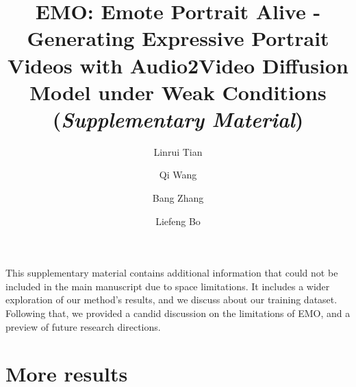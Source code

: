 \documentclass[runningheads]{llncs}
\begin{document}
\title{EMO: Emote Portrait Alive - Generating Expressive Portrait Videos with Audio2Video Diffusion Model under Weak Conditions (\textit{Supplementary Material})}


\author{Linrui Tian \and
Qi Wang \and
Bang Zhang \and
Liefeng Bo}


\maketitle

This supplementary material contains additional information that could not be included in the main manuscript due to space limitations. It includes a wider exploration of our method's results, and we discuss about our training dataset. Following that, we provided a candid discussion on the limitations of EMO, and a preview of future research directions.

\section{More results}
\end{document}
